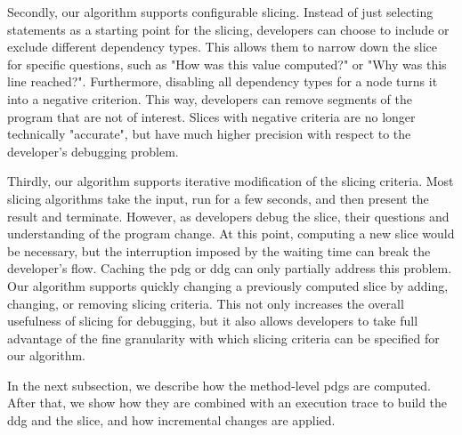 Secondly, our algorithm supports configurable slicing. 
Instead of just selecting statements as a starting point for the slicing, developers can choose to include or exclude different dependency types.
This allows them to narrow down the slice for specific questions, such as "How was this value computed?" or "Why was this line reached?".
Furthermore, disabling all dependency types for a node turns it into a negative criterion.
This way, developers can remove segments of the program that are not of interest.
Slices with negative criteria are no longer technically "accurate", but have much higher precision with respect to the developer's debugging problem.

Thirdly, our algorithm supports iterative modification of the slicing criteria.
Most slicing algorithms take the input, run for a few seconds, and then present the result and terminate.
However, as developers debug the slice, their questions and understanding of the program change.
At this point, computing a new slice would be necessary, but the interruption imposed by the waiting time can break the developer's flow.
Caching the \ac{pdg} or \ac{ddg} can only partially address this problem.
Our algorithm supports quickly changing a previously computed slice by adding, changing, or removing slicing criteria.
This not only increases the overall usefulness of slicing for debugging, but it also allows developers to take full advantage of the fine granularity with which slicing criteria can be specified for our algorithm.

%

In the next subsection, we describe how the method-level \acp{pdg} are computed.
After that, we show how they are combined with an execution trace to build the \ac{ddg} and the slice, and how incremental changes are applied.

